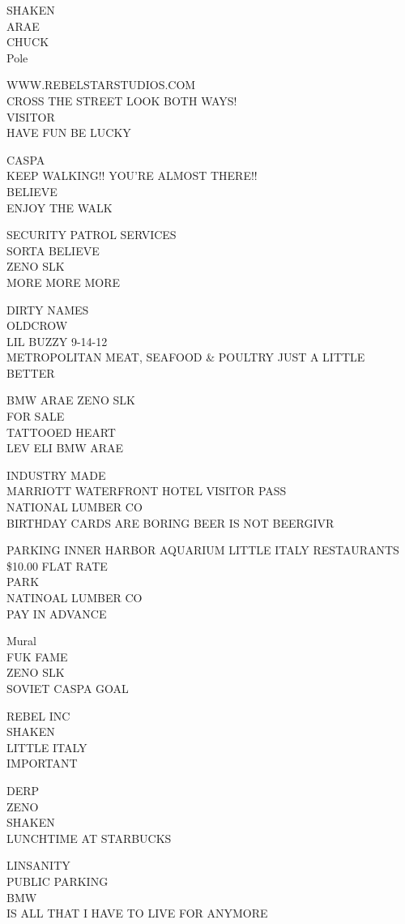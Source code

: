 \documentclass[10pt,letterpaper]{article}
\begin{document}
SHAKEN\\
ARAE\\
CHUCK\\
Pole

WWW.REBELSTARSTUDIOS.COM\\
CROSS THE STREET LOOK BOTH WAYS!\\
VISITOR\\
HAVE FUN BE LUCKY

CASPA\\
KEEP WALKING!! YOU'RE ALMOST THERE!!\\
BELIEVE\\
ENJOY THE WALK

SECURITY PATROL SERVICES\\
SORTA BELIEVE\\
ZENO SLK\\
MORE MORE MORE

DIRTY NAMES\\
OLDCROW\\
LIL BUZZY 9{-}14{-}12\\
METROPOLITAN MEAT, SEAFOOD \& POULTRY JUST A LITTLE BETTER

BMW ARAE ZENO SLK\\
FOR SALE\\
TATTOOED HEART\\
LEV ELI BMW ARAE

INDUSTRY MADE\\
MARRIOTT WATERFRONT HOTEL VISITOR PASS\\
NATIONAL LUMBER CO\\
BIRTHDAY CARDS ARE BORING BEER IS NOT BEERGIVR

PARKING INNER HARBOR AQUARIUM LITTLE ITALY RESTAURANTS \$10.00 FLAT RATE\\
PARK\\
NATINOAL LUMBER CO\\
PAY IN ADVANCE

Mural\\
FUK FAME\\
ZENO SLK\\
SOVIET CASPA GOAL

REBEL INC\\
SHAKEN\\
LITTLE ITALY\\
IMPORTANT

DERP\\
ZENO\\
SHAKEN\\
LUNCHTIME AT STARBUCKS

LINSANITY\\
PUBLIC PARKING\\
BMW\\
IS ALL THAT I HAVE TO LIVE FOR ANYMORE
\end{document}
